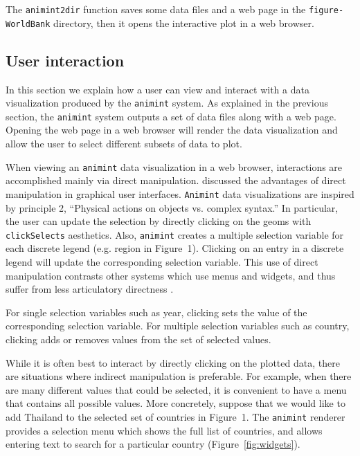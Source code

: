 \documentclass[journal]{vgtc}\usepackage[]{graphicx}\usepackage[]{color}
\begin{document}
The \texttt{animint2dir} function saves some data files and a web page
in the \texttt{figure-WorldBank} directory, then it opens the
interactive plot in a web browser.

\subsection{User interaction}

In this section we explain how a user can view and interact with a
data visualization produced by the \texttt{animint} system. As explained in the
previous section, the \texttt{animint} system outputs a set of data files along
with a web page. Opening the web page in a web browser will render the
data visualization and allow the user to select different subsets of data
to plot.

When viewing an \texttt{animint} data visualization in a web browser,
interactions are accomplished mainly via direct
manipulation. \citet{instrumental-interaction} discussed the
advantages of direct manipulation in graphical user
interfaces. \texttt{Animint} data visualizations are inspired by principle 2,
``Physical actions on objects vs. complex syntax.'' In particular, the
user can update the selection by directly clicking on the geoms with
\texttt{clickSelects} aesthetics. Also, \texttt{animint} creates a multiple
selection variable for each discrete legend (e.g. region in
Figure~1). Clicking on an entry in a discrete legend will update the
corresponding selection variable. This use of direct manipulation
contrasts other systems which use menus and widgets, and thus suffer
from less articulatory directness \citep{Hutchins:1985}.

For single selection variables such as year, clicking sets the value
of the corresponding selection variable. For multiple selection
variables such as country, clicking adds or removes values from the
set of selected values.

While it is often best to interact by directly clicking on the plotted
data, there are situations where indirect manipulation is
preferable. For example, when there are many different values that
could be selected, it is convenient to have a menu that contains all
possible values. More concretely, suppose that we would like to add
Thailand to the selected set of countries in Figure~1. The
\texttt{animint} renderer provides a selection menu which shows the
full list of countries, and allows entering text to search for a
particular country (Figure~\ref{fig:widgets}).
\end{document}
